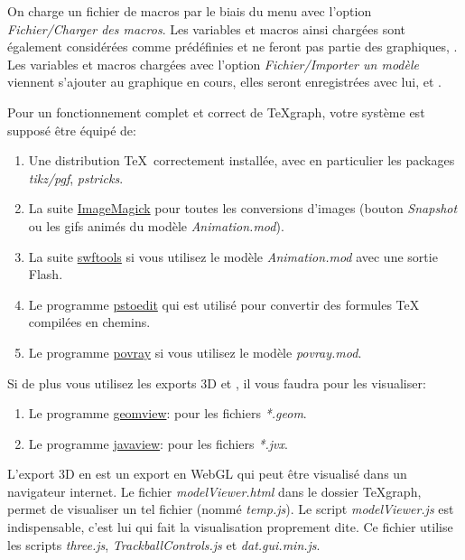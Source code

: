 On charge un fichier de macros par le biais du menu avec l'option \textit{Fichier/Charger des macros}. Les variables et macros ainsi chargées sont également considérées comme prédéfinies et ne feront pas partie des graphiques, . Les variables et macros chargées avec l'option \textit{Fichier/Importer un modèle} viennent s'ajouter au graphique en cours, elles seront enregistrées avec lui, et .

Pour un fonctionnement complet et correct de TeXgraph, votre système est supposé être équipé de:

\begin{enumerate}
 \item Une distribution \TeX\ correctement installée, avec en particulier les packages \textit{tikz/pgf}, \textit{pstricks}.
 \item La suite \href{https://www.imagemagick.org/}{ImageMagick} pour toutes les conversions d'images (bouton \textit{Snapshot} ou les gifs animés du modèle \textit{Animation.mod}).
 \item La suite \href{http://www.swftools.org/}{swftools} si vous utilisez le modèle \textit{Animation.mod} avec une
sortie Flash.
 \item Le programme \href{http://www.pstoedit.net/}{pstoedit} qui est utilisé pour convertir des formules \TeX{} compilées en chemins.
 \item Le programme \href{https://www.povray.org/}{povray} si vous utilisez le modèle \textit{povray.mod}.
\end{enumerate}

Si de plus vous utilisez les exports 3D  et , il vous faudra pour les visualiser:

\begin{enumerate}
\item Le programme \href{http://www.geomview.org/}{geomview}: pour les fichiers \textit{*.geom}.
\item Le programme \href{http://www.javaview.de/}{javaview}: pour les fichiers \textit{*.jvx}.
\end{enumerate}

L'export 3D en  est un export en WebGL qui peut être visualisé dans un navigateur internet. Le fichier \textit{modelViewer.html} dans le dossier TeXgraph, permet de visualiser un tel fichier (nommé \textit{temp.js}). Le script \textit{modelViewer.js} est indispensable, c'est lui qui fait la visualisation proprement dite. Ce fichier utilise les scripts \textit{three.js}, \textit{TrackballControls.js} et \textit{dat.gui.min.js}.

